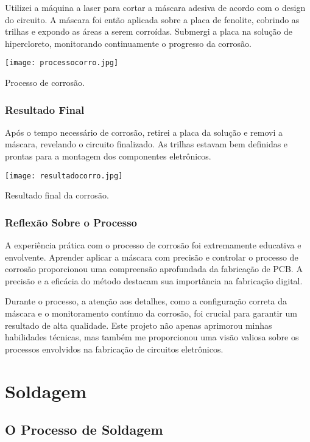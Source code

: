 \documentclass[
]{book}
\begin{document}
Utilizei a máquina a laser para cortar a máscara adesiva de acordo com o design do circuito. A máscara foi então aplicada sobre a placa de fenolite, cobrindo as trilhas e expondo as áreas a serem corroídas. Submergi a placa na solução de hipercloreto, monitorando continuamente o progresso da corrosão.

\texttt{[image: processocorro.jpg]}

Processo de corrosão.

\subsection{Resultado Final}\label{resultado-final-3}

Após o tempo necessário de corrosão, retirei a placa da solução e removi a máscara, revelando o circuito finalizado. As trilhas estavam bem definidas e prontas para a montagem dos componentes eletrônicos.

\texttt{[image: resultadocorro.jpg]}

Resultado final da corrosão.

\subsection{Reflexão Sobre o Processo}\label{reflexuxe3o-sobre-o-processo-4}

A experiência prática com o processo de corrosão foi extremamente educativa e envolvente. Aprender aplicar a máscara com precisão e controlar o processo de corrosão proporcionou uma compreensão aprofundada da fabricação de PCB. A precisão e a eficácia do método destacam sua importância na fabricação digital.

Durante o processo, a atenção aos detalhes, como a configuração correta da máscara e o monitoramento contínuo da corrosão, foi crucial para garantir um resultado de alta qualidade. Este projeto não apenas aprimorou minhas habilidades técnicas, mas também me proporcionou uma visão valiosa sobre os processos envolvidos na fabricação de circuitos eletrônicos.

\chapter{Soldagem}\label{soldagem}

\section{O Processo de Soldagem}\label{o-processo-de-soldagem}
\end{document}
